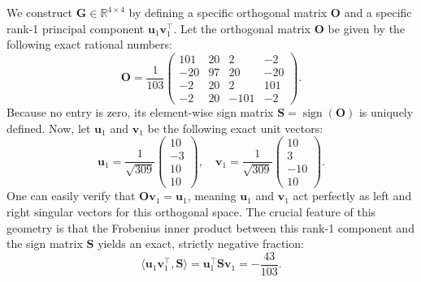 \documentclass[letterpaper]{article} %
\begin{document}
We construct $\mathbf{G} \in \mathbb{R}^{4 \times 4}$ by defining a specific orthogonal matrix $\mathbf{O}$ and a specific rank-1 principal component $\mathbf{u}_1 \mathbf{v}_1^\top$. Let the orthogonal matrix $\mathbf{O}$ be given by the following exact rational numbers:
\begin{equation}
\mathbf{O} = \frac{1}{103} \begin{pmatrix} 101 & 20 & 2 & -2 \\ -20 & 97 & 20 & -20 \\ -2 & 20 & 2 & 101 \\ -2 & 20 & -101 & -2 \end{pmatrix}.
\end{equation}
Because no entry is zero, its element-wise sign matrix $\mathbf{S} = \operatorname{sign}(\mathbf{O})$ is uniquely defined. Now, let $\mathbf{u}_1$ and $\mathbf{v}_1$ be the following exact unit vectors:
\begin{equation}
\mathbf{u}_1 = \frac{1}{\sqrt{309}} \begin{pmatrix} 10 \\ -3 \\ 10 \\ 10 \end{pmatrix}, \quad \mathbf{v}_1 = \frac{1}{\sqrt{309}} \begin{pmatrix} 10 \\ 3 \\ -10 \\ 10 \end{pmatrix}.
\end{equation}
One can easily verify that $\mathbf{O} \mathbf{v}_1 = \mathbf{u}_1$, meaning $\mathbf{u}_1$ and $\mathbf{v}_1$ act perfectly as left and right singular vectors for this orthogonal space. The crucial feature of this geometry is that the Frobenius inner product between this rank-1 component and the sign matrix $\mathbf{S}$ yields an exact, strictly negative fraction:
\begin{equation}
\langle \mathbf{u}_1 \mathbf{v}_1^\top, \mathbf{S} \rangle = \mathbf{u}_1^\top \mathbf{S} \mathbf{v}_1 = -\frac{43}{103}.
\end{equation}
\end{document}
